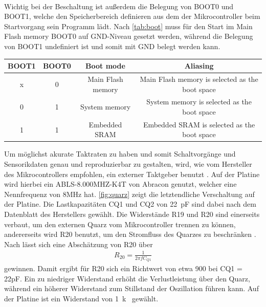 \noindent\begin{minipage}{0.75\textwidth}
\label{fig:mcupin}
\end{minipage}
\noindent\begin{minipage}{0.2\textwidth}
	\label{tab:pins}
\end{minipage}
\hspace{1cm}
\newline
\\
Wichtig bei der Beschaltung ist außerdem die Belegung von BOOT0 und BOOT1, welche den Speicherbereich definieren aus dem der Mikrocontroller beim Startvorgang sein Programm lädt. Nach \autoref{tab:boot} muss für den Start im Main Flash memory BOOT0 auf GND-Niveau gesetzt werden, während die Belegung von BOOT1 undefiniert ist und somit mit GND belegt werden kann.

\begin{table}[H]%
\centering
{}
\begin{tabular}{c c c c}
BOOT1 & BOOT0 & Boot mode & Aliasing \\ \hline
x & 0 & Main Flash memory & Main Flash memory is selected as the boot space\\
0 & 1 & System memory & System memory is selected as the boot space\\
1 & 1 & Embedded SRAM & Embedded SRAM is selected as the boot space
\end{tabular}

\label{tab:boot}
\end{table}\noindent
Um möglichst akurate Taktraten zu haben und somit Schaltvorgänge und Sensorikdaten genau und reproduzierbar zu gestalten, wird, wie vom Hersteller des Mikrocontrollers empfohlen, ein externer Taktgeber benutzt \cite[S.218]{stmref}. Auf der Platine wird hierbei ein ABLS-8.000MHZ-K4T von Abracon genutzt, welcher eine Nennfrequenz von 8MHz hat. \autoref{fig:quarz} zeigt die letztendliche Verschaltung auf der Platine. Die Lastkapazitäten CQ1 und CQ2 von \SI{22}{pF} sind dabei nach dem Datenblatt des Herstellers gewählt. Die Widerstände R19 und R20 sind einerseits verbaut, um den externen Quarz vom Mikrocontroller trennen zu können, andererseits wird R20 benutzt, um den Stromfluss des Quarzes zu beschränken \cite[S.16]{stmquarz}. Nach \cite[S.16]{stmquarz} lässt sich eine Abschätzung von R20 über
\begin{align*}
R_{20} = \frac{1}{2\pi f C_{Q1}}
\end{align*}
gewinnen. Damit ergibt für R20 sich ein Richtwert von etwa \SI{900}{\Omega} bei CQ1 = 22pF. Ein zu niedriger Widerstand erhöht die Verlustleistung über den Quarz, während ein höherer Widerstand zum Stillstand der Oszillation führen kann. Auf der Platine ist ein Widerstand von \SI{1}{k\Omega} gewählt.

